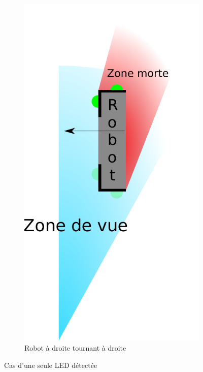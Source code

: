 \begin{itemize}
\begin{figure}[H]
\begin{subfigure}[h]{0.2\textwidth}
					        \includegraphics[width=\textwidth]{Graphics/casClignotants_GD.pdf}
					        \caption{Robot à droite tournant à droite}
					    \end{subfigure}
					    \caption{Cas d'une seule LED détectée}
					\end{figure}

\end{itemize}
